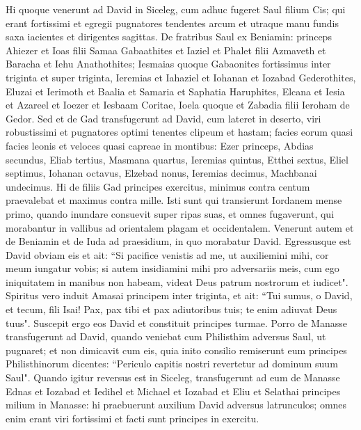 \begin{biblechapter}  
\verse Hi quoque venerunt ad David in Siceleg, cum adhuc fugeret Saul filium Cis; qui erant fortissimi et egregii pugnatores 
\verse tendentes arcum et utraque manu fundis saxa iacientes et dirigentes sagittas. De fratribus Saul ex Beniamin: 
\verse princeps Ahiezer et Ioas filii Samaa Gabaathites et Iaziel et Phalet filii Azmaveth et Baracha et Iehu Anathothites; 
\verse Iesmaias quoque Gabaonites fortissimus inter triginta et super triginta, 
\verse Ieremias et Iahaziel et Iohanan et Iozabad Gederothites, 
\verse Eluzai et Ierimoth et Baalia et Samaria et Saphatia Haruphites, 
\verse Elcana et Iesia et Azareel et Ioezer et Iesbaam Coritae, 
\verse Ioela quoque et Zabadia filii Ieroham de Gedor. 
\verse Sed et de Gad transfugerunt ad David, cum lateret in deserto, viri robustissimi et pugnatores optimi tenentes clipeum et hastam; facies eorum quasi facies leonis et veloces quasi capreae in montibus: 
\verse Ezer princeps, Abdias secundus, Eliab tertius, 
\verse Masmana quartus, Ieremias quintus, 
\verse Etthei sextus, Eliel septimus, 
\verse Iohanan octavus, Elzebad nonus, 
\verse Ieremias decimus, Machbanai undecimus. 
\verse Hi de filiis Gad principes exercitus, minimus contra centum praevalebat et maximus contra mille. 
\verse Isti sunt qui transierunt Iordanem mense primo, quando inundare consuevit super ripas suas, et omnes fugaverunt, qui morabantur in vallibus ad orientalem plagam et occidentalem. 
\verse Venerunt autem et de Beniamin et de Iuda ad praesidium, in quo morabatur David. 
\verse Egressusque est David obviam eis et ait: “Si pacifice venistis ad me, ut auxiliemini mihi, cor meum iungatur vobis; si autem insidiamini mihi pro adversariis meis, cum ego iniquitatem in manibus non habeam, videat Deus patrum nostrorum et iudicet". 
\verse Spiritus vero induit Amasai principem inter triginta, et ait: “Tui sumus, o David, et tecum, fili Isai! Pax, pax tibi et pax adiutoribus tuis; te enim adiuvat Deus tuus". Suscepit ergo eos David et constituit principes turmae. 
\verse Porro de Manasse transfugerunt ad David, quando veniebat cum Philisthim adversus Saul, ut pugnaret; et non dimicavit cum eis, quia inito consilio remiserunt eum principes Philisthinorum dicentes: “Periculo capitis nostri revertetur ad dominum suum Saul". 
\verse Quando igitur reversus est in Siceleg, transfugerunt ad eum de Manasse Ednas et Iozabad et Iedihel et Michael et Iozabad et Eliu et Selathai principes milium in Manasse: 
\verse hi praebuerunt auxilium David adversus latrunculos; omnes enim erant viri fortissimi et facti sunt principes in exercitu. 

\end{biblechapter}
